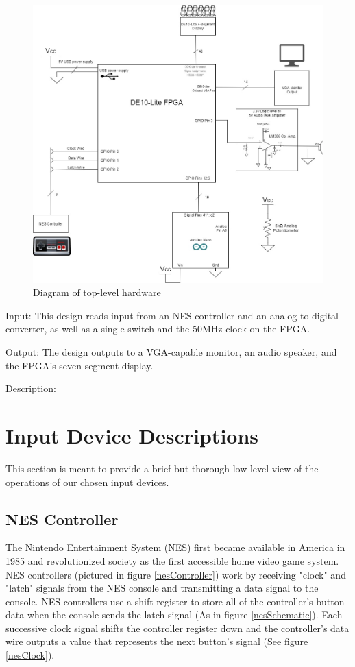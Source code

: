 \documentclass[a4paper]{article}
\begin{document}
\begin{figure}[H]
    \includegraphics[width=0.8 \linewidth]{images/hardwareDiagram.jpg}
    \caption{Diagram of top-level hardware}
    \label{hardware}
\end{figure}

Input: This design reads input from an NES controller and an analog-to-digital converter, as well as a single switch and the 50MHz clock on the FPGA.

Output: The design outputs to a VGA-capable monitor, an audio speaker, and the FPGA's seven-segment display.

Description:

\section{Input Device Descriptions}

This section is meant to provide a brief but thorough low-level view of the operations of our chosen input devices. 

\subsection{NES Controller}

The Nintendo Entertainment System (NES) first became available in America in 1985 and revolutionized society as the first accessible home video game system. NES controllers (pictured in figure \ref{nesController}) work by receiving "clock" and "latch" signals from the NES console and transmitting a data signal to the console. NES controllers use a shift register to store all of the controller's button data when the console sends the latch signal (As in figure \ref{nesSchematic}). Each successive clock signal shifts the controller register down and the controller's data wire outputs a value that represents the next button's signal (See figure \ref{nesClock}). 
\end{document}
